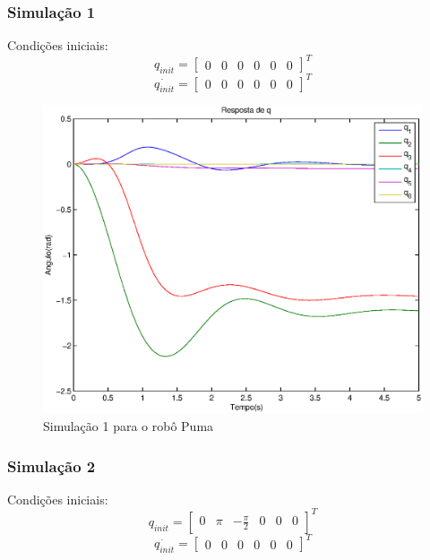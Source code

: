\documentclass{article}
\begin{document}
\subsubsection{Simulação 1}
Condições iniciais:
\begin{equation}
\label{eq:sim1q}
q_{init}=\begin{bmatrix}
0 & 0 & 0 & 0 & 0 & 0
\end{bmatrix}^T
\end{equation}
\begin{equation}
\label{eq:sim1qd}
\dot{q_{init}}=\begin{bmatrix}
0 & 0 & 0 & 0 & 0 & 0
\end{bmatrix}^T
\end{equation}

\begin{figure}[H]
	\centering
	\includegraphics[width=0.8\linewidth]{../sim1ode}
	\caption{Simulação 1 para o robô Puma}
	\label{fig:pumasim1}
\end{figure}

\subsubsection{Simulação 2}
Condições iniciais:
\begin{equation}
\label{eq:sim2q}
q_{init}=\begin{bmatrix}
0 & \pi & -\frac{\pi}{2} & 0 & 0 & 0
\end{bmatrix}^T
\end{equation}
\begin{equation}
\label{eq:sim2qd}
\dot{q_{init}}=\begin{bmatrix}
0 & 0 & 0 & 0 & 0 & 0
\end{bmatrix}^T
\end{equation}
\end{document}
